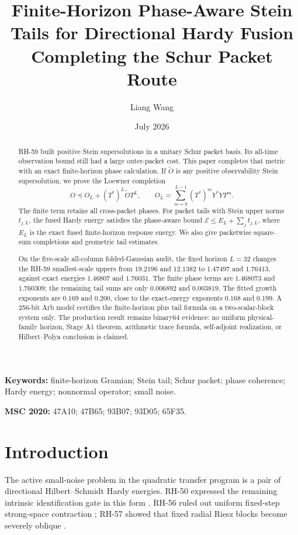 \documentclass[11pt]{article}
\title{Finite-Horizon Phase-Aware Stein Tails for Directional Hardy Fusion\\
\large Completing the Schur Packet Route}
\author{Liang Wang}
\date{July 2026}
\theoremstyle{remark}
\newcommand{\cE}{\mathcal E}
\begin{document}
\maketitle

\begin{abstract}
RH-59 built positive Stein supersolutions in a unitary Schur packet basis.
Its all-time observation bound still had a large outer-packet cost.  This paper completes that metric
with an exact finite-horizon phase calculation.  If $\widetilde O$ is any
positive observability Stein supersolution, we prove the Loewner completion
\[
 O\preceq O_L+(T^*)^L\widetilde O T^L,
 \qquad
 O_L=\sum_{m=0}^{L-1}(T^*)^mY^*YT^m.
\]
The finite term retains all cross-packet phases.  For packet tails with
Stein upper norms $t_{j,L}$, the fused Hardy energy satisfies the
phase-aware bound $\cE\le E_L+\sum_jt_{j,L}$, where $E_L$ is the exact fused
finite-horizon response energy.  We also give packetwise square-sum
completions and geometric tail estimates.

On the five-scale all-column folded-Gaussian audit, the fixed horizon
$L=32$ changes the RH-59 smallest-scale uppers from $19.2196$ and $12.1382$
to $1.47497$ and $1.76413$, against exact energies $1.46807$ and $1.76031$.
The finite phase terms are $1.468073$ and $1.760309$; the remaining tail sums
are only $0.006892$ and $0.003819$.  The fitted growth exponents are
$0.169$ and $0.200$, close to the exact-energy exponents $0.168$ and
$0.199$.  A 256-bit Arb model certifies the finite-horizon plus tail formula
on a two-scalar-block system only.  The production result remains binary64
evidence: no uniform physical-family horizon, Stage A1 theorem, arithmetic
trace formula, self-adjoint realization, or Hilbert--Polya conclusion is
claimed.
\end{abstract}

\noindent\textbf{Keywords:} finite-horizon Gramian; Stein tail; Schur packet;
phase coherence; Hardy energy; nonnormal operator; small noise.

\medskip
\noindent\textbf{MSC 2020:} 47A10; 47B65; 93B07; 93D05; 65F35.

\section{Introduction}

The active small-noise problem in the quadratic transfer program is a pair
of directional Hilbert--Schmidt Hardy energies.  RH-50 expressed the
remaining intrinsic identification gate in this form
\citep{WangHardy2026}.  RH-56 ruled out uniform fixed-step strong-space
contraction \citep{WangHardyBarrier2026}; RH-57 showed that fixed radial
Riesz blocks become severely oblique \citep{WangRieszOverlap2026}.
\end{document}
